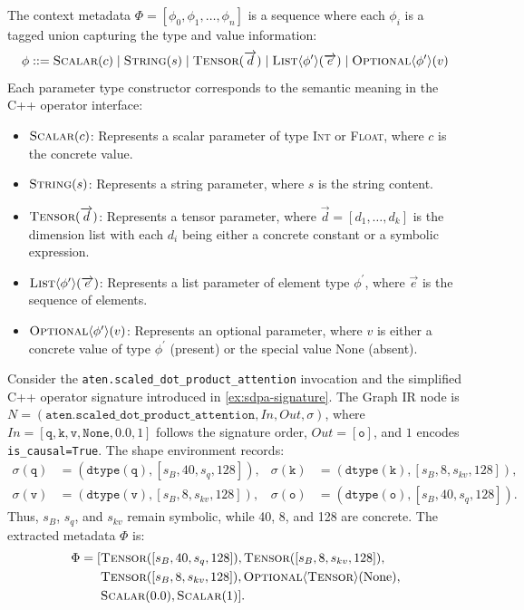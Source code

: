 The context metadata $\Phi = [\phi_0, \phi_1, \dots, \phi_n]$ is a sequence where each $\phi_i$ is a tagged union capturing the type and value information:
\begin{equation}
  \phi ::= \textsc{Scalar}(c) \mid \textsc{String}(s) \mid \textsc{Tensor}(\vec{d}) \mid \textsc{List}\langle\phi^{\prime}\rangle(\vec{e}) \mid \textsc{Optional}\langle\phi^{\prime}\rangle(v)
\end{equation}
Each parameter type constructor corresponds to the semantic meaning in the C++ operator interface:
\begin{itemize}
    \item $\textsc{Scalar}(c)$: Represents a scalar parameter of type \textsc{Int} or \textsc{Float}, where $c$ is the concrete value.
    \item $\textsc{String}(s)$: Represents a string parameter, where $s$ is the string content.
    \item $\textsc{Tensor}(\vec{d})$: Represents a tensor parameter, where $\vec{d} = [d_1, \dots, d_k]$ is the dimension list with each $d_i$ being either a concrete constant or a symbolic expression.
    \item $\textsc{List}\langle\phi^{\prime}\rangle(\vec{e})$: Represents a list parameter of element type $\phi^{\prime}$, where $\vec{e}$ is the sequence of elements.
    \item $\textsc{Optional}\langle\phi^{\prime}\rangle(v)$: Represents an optional parameter, where $v$ is either a concrete value of type $\phi^{\prime}$ (present) or the special value $\text{None}$ (absent).
\end{itemize}


\begin{example}
	Consider the \texttt{aten.scaled\_dot\_product\_attention} invocation and the simplified C++ operator signature introduced in \cref{ex:sdpa-signature}.
	The Graph IR node is $N = (\texttt{aten.scaled\_dot\_product\_attention}, \mathit{In}, \mathit{Out}, \sigma)$, where $\mathit{In}=[\texttt{q},\texttt{k},\texttt{v},\texttt{None},0.0,1]$ follows the signature order, $\mathit{Out}=[\texttt{o}]$, and $1$ encodes \texttt{is\_causal=True}.
	The shape environment records:
	\begin{align*}
		\sigma(\texttt{q}) & = (\texttt{dtype}(\texttt{q}),[s_B,40,s_q,128]), &
		\sigma(\texttt{k}) & = (\texttt{dtype}(\texttt{k}),[s_B,8,s_{kv},128]), \\
		\sigma(\texttt{v}) & = (\texttt{dtype}(\texttt{v}),[s_B,8,s_{kv},128]), &
		\sigma(\texttt{o}) & = (\texttt{dtype}(\texttt{o}),[s_B,40,s_q,128]).
	\end{align*}
	Thus, $s_B$, $s_q$, and $s_{kv}$ remain symbolic, while 40, 8, and 128 are concrete.
	The extracted metadata $\Phi$ is:
	\begin{align*}
		\Phi = [ & \textsc{Tensor}([s_B,40,s_q,128]), \textsc{Tensor}([s_B,8,s_{kv},128]), \\
		         & \textsc{Tensor}([s_B,8,s_{kv},128]), \textsc{Optional}\langle\textsc{Tensor}\rangle(\text{None}), \\
		         & \textsc{Scalar}(0.0), \textsc{Scalar}(1) ].
	\end{align*}
\end{example}

